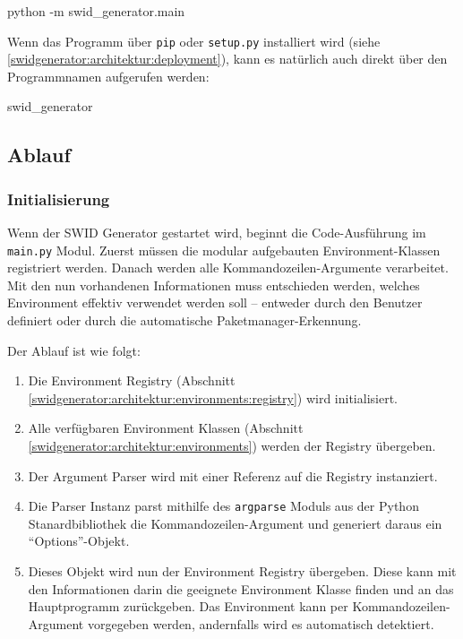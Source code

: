 \begin{bashcode}
python -m swid_generator.main
\end{bashcode}

Wenn das Programm über \texttt{pip} oder \texttt{setup.py} installiert wird (siehe
\autoref{swidgenerator:architektur:deployment}), kann es natürlich auch direkt
über den Programmnamen aufgerufen werden:

\begin{bashcode}
swid_generator
\end{bashcode}

\subsection{Ablauf}

\subsubsection{Initialisierung}
\label{swidgenerator:architektur:initialisierung}

Wenn der SWID Generator gestartet wird, beginnt die Code-Ausführung im
\texttt{main.py} Modul. Zuerst müssen die modular aufgebauten
Environment-Klassen registriert werden. Danach werden alle
Kommandozeilen-Argumente verarbeitet. Mit den nun vorhandenen Informationen muss
entschieden werden, welches Environment effektiv verwendet werden soll --
entweder durch den Benutzer definiert oder durch die automatische
Paketmanager-Erkennung.

Der Ablauf ist wie folgt:

\begin{enumerate}
	\item Die Environment Registry
		(Abschnitt \ref{swidgenerator:architektur:environments:registry}) wird initialisiert.
	\item Alle verfügbaren Environment Klassen
		(Abschnitt \ref{swidgenerator:architektur:environments}) werden der Registry
		übergeben.
	\item Der Argument Parser wird mit einer Referenz auf die Registry instanziert.
	\item Die Parser Instanz parst mithilfe des \texttt{argparse} Moduls aus der
		Python Stanardbibliothek die Kommandozeilen-Argument und generiert daraus ein
		\enquote{Options}-Objekt. \item Dieses Objekt wird nun der Environment Registry
		übergeben. Diese kann mit den Informationen darin die geeignete Environment
		Klasse finden und an das Hauptprogramm zurückgeben. Das Environment kann per
		Kommandozeilen-Argument vorgegeben werden, andernfalls wird es automatisch
		detektiert.
\end{enumerate}

